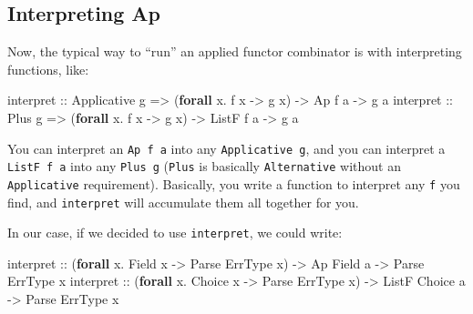 \documentclass[]{article}
\newenvironment{Shaded}{}{}
\newcommand{\DataTypeTok}[1]{\textcolor[rgb]{0.56,0.13,0.00}{#1}}
\newcommand{\KeywordTok}[1]{\textcolor[rgb]{0.00,0.44,0.13}{\textbf{#1}}}
\newcommand{\NormalTok}[1]{#1}
\newcommand{\OperatorTok}[1]{\textcolor[rgb]{0.40,0.40,0.40}{#1}}
\newcommand{\OtherTok}[1]{\textcolor[rgb]{0.00,0.44,0.13}{#1}}
\begin{document}
\hypertarget{interpreting-ap}{%
\subsection{Interpreting Ap}\label{interpreting-ap}}

Now, the typical way to ``run'' an applied functor combinator is with
interpreting functions, like:

\begin{Shaded}
\begin{Highlighting}[]
\OtherTok{interpret ::} \DataTypeTok{Applicative}\NormalTok{ g }\OtherTok{=>}\NormalTok{ (}\KeywordTok{forall}\NormalTok{ x}\OperatorTok{.}\NormalTok{ f x }\OtherTok{{-}>}\NormalTok{ g x) }\OtherTok{{-}>} \DataTypeTok{Ap}\NormalTok{ f a    }\OtherTok{{-}>}\NormalTok{ g a}
\OtherTok{interpret ::} \DataTypeTok{Plus}\NormalTok{ g        }\OtherTok{=>}\NormalTok{ (}\KeywordTok{forall}\NormalTok{ x}\OperatorTok{.}\NormalTok{ f x }\OtherTok{{-}>}\NormalTok{ g x) }\OtherTok{{-}>} \DataTypeTok{ListF}\NormalTok{ f a }\OtherTok{{-}>}\NormalTok{ g a}
\end{Highlighting}
\end{Shaded}

You can interpret an \texttt{Ap\ f\ a} into any \texttt{Applicative\ g}, and you
can interpret a \texttt{ListF\ f\ a} into any \texttt{Plus\ g} (\texttt{Plus} is
basically \texttt{Alternative} without an \texttt{Applicative} requirement).
Basically, you write a function to interpret any \texttt{f} you find, and
\texttt{interpret} will accumulate them all together for you.

In our case, if we decided to use \texttt{interpret}, we could write:

\begin{Shaded}
\begin{Highlighting}[]
\OtherTok{interpret ::}\NormalTok{ (}\KeywordTok{forall}\NormalTok{ x}\OperatorTok{.} \DataTypeTok{Field}\NormalTok{  x }\OtherTok{{-}>} \DataTypeTok{Parse} \DataTypeTok{ErrType}\NormalTok{ x) }\OtherTok{{-}>} \DataTypeTok{Ap}    \DataTypeTok{Field}\NormalTok{  a }\OtherTok{{-}>} \DataTypeTok{Parse} \DataTypeTok{ErrType}\NormalTok{ x}
\OtherTok{interpret ::}\NormalTok{ (}\KeywordTok{forall}\NormalTok{ x}\OperatorTok{.} \DataTypeTok{Choice}\NormalTok{ x }\OtherTok{{-}>} \DataTypeTok{Parse} \DataTypeTok{ErrType}\NormalTok{ x) }\OtherTok{{-}>} \DataTypeTok{ListF} \DataTypeTok{Choice}\NormalTok{ a }\OtherTok{{-}>} \DataTypeTok{Parse} \DataTypeTok{ErrType}\NormalTok{ x}
\end{Highlighting}
\end{Shaded}
\end{document}
